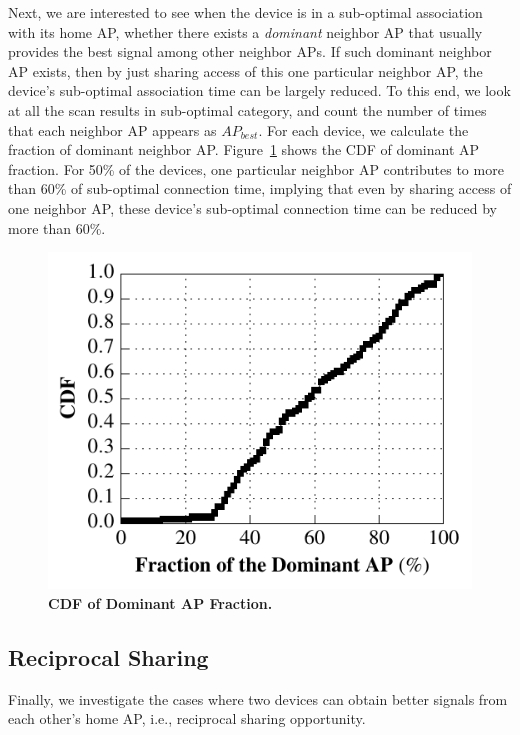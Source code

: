 Next, we are interested to see when the device is in a sub-optimal association
with its home AP, whether there exists a \textit{dominant} neighbor AP that
usually provides the best signal among other neighbor APs. If such dominant
neighbor AP exists, then by just sharing access of this one particular neighbor
AP, the device's sub-optimal association time can be largely reduced. To this
end, we look at all the scan results in sub-optimal category, and count the
number of times that each neighbor AP appears as $AP_{best}$. For each device,
we calculate the fraction of dominant neighbor AP. Figure~\ref{fig:dominantap}
shows the CDF of dominant AP fraction. For 50\% of the devices, one particular
neighbor AP contributes to more than 60\% of sub-optimal connection time,
implying that even by sharing \wifi{} access of one neighbor AP, these device's
sub-optimal connection time can be reduced by more than 60\%.

\begin{figure}[t]
  \centering
  \includegraphics[width=\columnwidth]{./figures/BetterNeighborAPFigure.pdf}
  \caption{\textbf{CDF of Dominant AP Fraction.}}
  \label{fig:dominantap}
\end{figure}


\subsection{Reciprocal Sharing}
\label{subsec:reciprocal}

Finally, we investigate the cases where two devices can obtain better signals
from each other's home AP, i.e., reciprocal sharing opportunity.

\newpage
\clearpage

